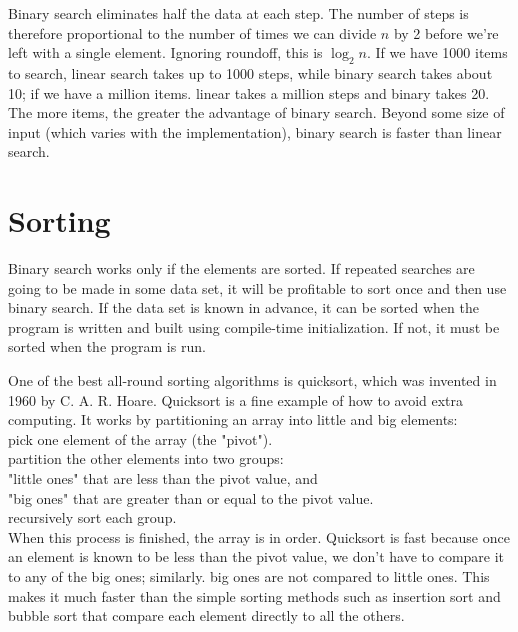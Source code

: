 Binary search eliminates half the data at each step. The number of steps is
therefore proportional to the number of times we can divide $n$ by 2
before we're left with a single element. Ignoring roundoff, this is $\log_2
n$. If we have 1000 items to search, linear search takes up to 1000 steps,
while binary search takes about 10; if we have a million items. linear
takes a million steps and binary takes 20. The more items, the greater the
advantage of binary search. Beyond some size of input (which varies with
the implementation), binary search is faster than linear search.

\section{Sorting}
Binary search works only if the elements are sorted. If repeated searches
are going to be made in some data set, it will be profitable to sort once
and then use binary search. If the data set is known in advance, it can be
sorted when the program is written and built using compile-time
initialization. If not, it must be sorted when the program is run.

One of the best all-round sorting algorithms is quicksort, which was
invented in 1960 by C. A. R. Hoare. Quicksort is a fine example of how to
avoid extra computing. It works by partitioning an array into little and
big elements:                                                           \\
\indent pick one element of the array (the "pivot").                    \\
\indent partition the other elements into two groups:                   \\
\indent \indent "little ones" that are less than the pivot value, and   \\
\indent \indent "big ones" that are greater than or equal to the pivot
value.                                                                  \\
\indent recursively sort each group.                                    \\

When this process is finished, the array is in order. Quicksort is fast
because once an element is known to be less than the pivot value, we don't
have to compare it to any of the big ones; similarly. big ones are not
compared to little ones. This makes it much faster than the simple sorting
methods such as insertion sort and bubble sort that compare each element
directly to all the others.

